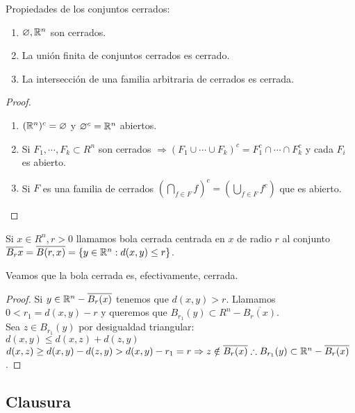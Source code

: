 \begin{prop}
  Propiedades de los conjuntos cerrados:
  \begin{enumerate}
    \item \(\varnothing, \mathbb{R}^n\) son cerrados.
    \item La unión finita de conjuntos cerrados es cerrado.
    \item La intersección de una familia arbitraria de cerrados es cerrada.
  \end{enumerate}
  \begin{proof}
    \begin{enumerate}
      \item \((\mathbb{R}^n)^c = \varnothing\) y \(\varnothing^c = \mathbb{R}^n\) abiertos.
      \item Si \(F_1, \cdots, F_k \subset R^n\) son cerrados \(\Rightarrow (F_1 \cup \cdots \cup F_k)^c = F_1^c \cap \cdots \cap F_k^c\) y cada \(F_i\) es abierto.
      \item Si \(F\) es una familia de cerrados \((\bigcap_{f \in F} f)^c = (\bigcup_{f \in F} f^c)\) que es abierto.
    \end{enumerate}
  \end{proof}
\end{prop}

\begin{definition}
  Si \(x \in R^n, r > 0\) llamamos bola cerrada centrada en \(x\) de radio \(r\) al conjunto \(\overline{B_r{x}} = \overline{B(r, x)} = \{ y \in \mathbb{R}^n : d(x, y) \leq r \}\).
\end{definition}

\begin{prop}
  Veamos que la bola cerrada es, efectivamente, cerrada.
  \begin{proof}
    Si \(y \in \mathbb{R}^n - \overline{B_r(x)}\) tenemos que \(d(x, y) > r\). Llamamos \(0 < r_1 = d(x, y) - r\) y queremos que \(B_{r_1}(y) \subset R^n - \overline{B_r(x)}\). \\
    Sea \(z \in B_{r_1}(y)\) por desigualdad triangular: \\
    \(d(x, y) \leq d(x, z) + d(z, y)\) \\
    \(d(x, z) \geq d(x, y) - d(z, y) > d(x, y) - r_1 = r \Rightarrow z \notin \overline{B_r(x)} \therefore B_{r_1}(y) \subset \mathbb{R}^n - \overline{B_r(x)}\).
  \end{proof}
\end{prop}

\subsection{Clausura}

